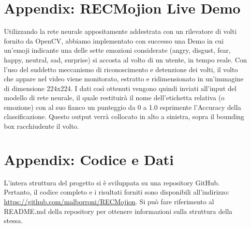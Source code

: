 \begin{appendix}
\appendix
\section{Appendix: RECMojion Live Demo}
Utilizzando la rete neurale appositamente addestrata con un rilevatore di volti fornito da OpenCV, abbiamo implementato con successo una Demo in cui un'emoji indicante una delle sette emozioni considerate (angry, disgust, fear, happy, neutral, sad, surprise) si accosta al volto di un utente, in tempo reale.
Con l'uso del suddetto meccanismo di riconoscimento e detenzione dei volti, il volto che appare nel video viene monitorato, estratto e ridimensionato in un'immagine di dimensione 224x224. I dati così ottenuti vengono quindi inviati all'input del modello di rete neurale, il quale restituirà il nome dell'etichetta relativa (o emozione) con al suo fianco un punteggio da 0 a 1.0 esprimente l'Accuracy della classificazione. 
Questo output verrà collocato in alto a sinistra, sopra il bounding box racchiudente il volto.

\section{Appendix: Codice e Dati}
L'intera struttura del progetto si è sviluppata su una repository GitHub.
Pertanto, il codice completo e i risultati forniti sono disponibili all'indirizzo: \url{https://github.com/malborroni/RECMojion}.
Si può fare riferimento al README.md della repository per ottenere informazioni sulla struttura della stessa.
\end{appendix}


